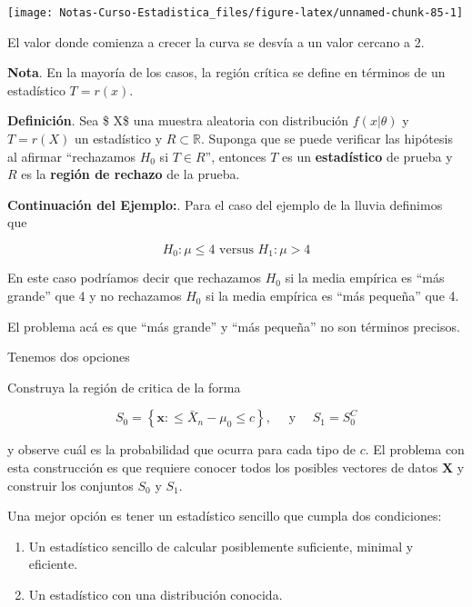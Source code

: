 \documentclass[
  12pt,
]{book}
\providecommand{\tightlist}{%
  \setlength{\itemsep}{0pt}\setlength{\parskip}{0pt}}
\begin{document}
\begin{center}\texttt{[image: Notas-Curso-Estadistica\_files/figure-latex/unnamed-chunk-85-1]} \end{center}

El valor donde comienza a crecer la curva se desvía a un valor cercano a 2.

\textbf{Nota}. En la mayoría de los casos, la región crítica se define en términos de
un estadístico \(T = r(x)\).

\textbf{Definición}. Sea \$ X\$ una muestra aleatoria con distribución \(f(x|\theta)\) y
\(T=r(X)\) un estadístico y \(R\subset \mathbb R\). Suponga que se puede verificar
las hipótesis al afirmar ``rechazamos \(H_0\) si \(T\in R\)'', entonces \(T\) es un
\textbf{estadístico} de prueba y \(R\) es la \textbf{región de rechazo} de la prueba.

\textbf{Continuación del Ejemplo:}. Para el caso del ejemplo de la lluvia definimos
que

\[
H_0: \mu \leq 4 \text{ versus } H_1: \mu > 4
\]

En este caso podríamos decir que rechazamos \(H_0\) si la media empírica
es ``más grande'' que 4 y no rechazamos \(H_0\) si la media empírica es ``más
pequeña'' que 4.

El problema acá es que ``más grande'' y ``más pequeña'' no son términos precisos.

Tenemos dos opciones

Construya la región de critica de la forma

\begin{equation} 
S_{0}=\left\{\boldsymbol{x}:\leq \bar{X}_{n}-\mu_{0} \leq
c\right\}, \quad \text { y } \quad S_{1}=S_{0}^{C} 
\end{equation}

y observe cuál es la probabilidad que ocurra para cada tipo de \(c\). El
problema con esta construcción es que requiere conocer todos los posibles
vectores de datos \(\mathbf{X}\) y construir los conjuntos \(S_0\) y \(S_1\).

Una mejor opción es tener un estadístico sencillo que cumpla dos condiciones:

\begin{enumerate}
\def\labelenumi{\arabic{enumi}.}
\tightlist
\item
  Un estadístico sencillo de calcular posiblemente suficiente, minimal y
  eficiente.
\item
  Un estadístico con una distribución conocida.
\end{enumerate}
\end{document}
